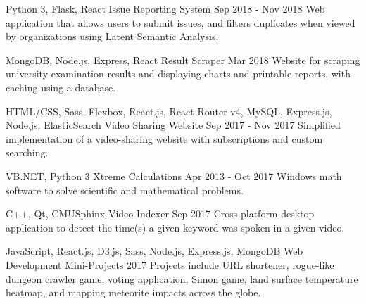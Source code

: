 \begin{cventries}
  \cventry
    {Python 3, Flask, React} %
    {Issue Reporting System} %
    {} %
    {Sep 2018 - Nov 2018} %
    {
      Web application that allows users to submit issues, and filters duplicates when viewed by organizations using Latent Semantic Analysis.
    }

  \cventry
    {MongoDB, Node.js, Express, React} %
    {Result Scraper} %
    {} %
    {Mar 2018} %
    {
      Website for scraping university examination results and displaying charts and printable reports, with caching using a database.
    }

  \cventry
    {HTML/CSS, Sass, Flexbox, React.js, React-Router v4, MySQL, Express.js, Node.js, ElasticSearch} %
    {Video Sharing Website} %
    {} %
    {Sep 2017 - Nov 2017} %
    {
      Simplified implementation of a video-sharing website with subscriptions and custom searching.
    }

  \cventry
    {VB.NET, Python 3} %
    {Xtreme Calculations} %
    {} %
    {Apr 2013 - Oct 2017} %
    {
      Windows math software to solve scientific and mathematical problems.
    }

  \cventry
    {C++, Qt, CMUSphinx} %
    {Video Indexer} %
    {} %
    {Sep 2017} %
    {
      Cross-platform desktop application to detect the time(s) a given keyword was spoken in a given video.
    }

  \cventry
    {JavaScript, React.js, D3.js, Sass, Node.js, Express.js, MongoDB} %
    {Web Development Mini-Projects} %
    {} %
    {2017} %
    {
      Projects include URL shortener, rogue-like dungeon crawler game, voting application, Simon game, land surface temperature heatmap, and mapping meteorite impacts across the globe.
    }


\end{cventries}
